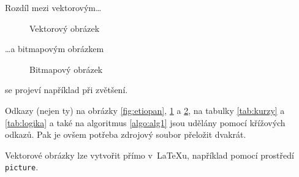 \documentclass[11pt, a4paper]{article}
\begin{document}
Rozdíl mezi vektorovým\dots
\begin{figure}[H]
    \centering
    \caption{Vektorový obrázek}
    \label{fig:vector}
\end{figure}
\medskip
\dots a bitmapovým obrázkem
\begin{figure}[H]
    \centering
    \caption{Bitmapový obrázek}
    \label{fig:bitmap}
\end{figure}
\bigskip
se projeví například při zvětšení.

Odkazy (nejen ty) na obrázky \ref{fig:etiopan}, \ref{fig:vector} a \ref{fig:bitmap}, na tabulky \ref{tab:kurzy} a \ref{tab:logika} a také na algoritmus \ref{algo:alg1} jsou udělány pomocí křížových odkazů. Pak je ovšem potřeba zdrojový soubor přeložit dvakrát.

Vektorové obrázky lze vytvořit přímo v~\LaTeX{}u, například pomocí prostředí\verb| picture|.

\newpage
\end{document}
